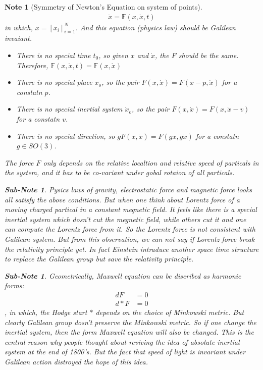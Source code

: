 \documentclass[pdf]{article}
\newtheorem{note}[theorem]{Note}
\newtheorem{subnote}[corollary]{Sub-Note}
\begin{document}
\begin{note}[Symmetry of Newton's Equation on system of points]
\begin{align}
\ddot x = \mathbb{F}(x,\dot{x},t)
\end{align}
in which, $x = [x_i]_{i=1}^N$. And this equation (physics law) should be Galilean invaiant.
\begin{itemize}
\item There is no special time $t_0$, so given $x$ and $\dot x$, the $F$ should be the same. Therefore, $\mathbb{F}(x,\dot{x},t) = \mathbb{F}(x,\dot{x})$
\item There is no special place $x_o$, so the pair $F(x, \dot x) = F(x-p, \dot x)$ for a constatn $p$.
\item There is no special inertial system $\dot x_o$, so the pair $F(x, \dot x) = F(x, \dot x -v )$ for a constatn $v$.
\item There is no special direction, so $gF(x, \dot x) = F(gx, g\dot x )$ for a constatn $g\in SO(3)$.
\end{itemize}
The force $F$ only depends on the relative localtion and relative speed of particals in the system, and it has to be co-variant under gobal rotaion of all particals.
\begin{subnote}
Pysics laws of gravity, electrostatic force and magnetic force looks all satisfy the above conditions. But when one think about Lorentz force of a moving charged partical in a constant megnetic field. It feels like there is a special inertial system which dosn't cut the megnetic field, while others cut it and one can compute the Lorentz force from it. So the Lorentz force is not consistent with Galilean system. But from this observation, we can not say if Lorentz force break the relativity principle yet. In fact Einstein intraduce another space time structure to replace the Galilean group but save the relativity principle.
\end{subnote}
\begin{subnote}
Geometrically, Maxwell equation can be discribed as harmonic forms:
\begin{align}
dF &= 0\\
d*F &= 0
\end{align}
, in which, the Hodge start $*$ depends on the choice of Minkowski metric. But clearly Galilean group dosn't preserve the Minkowski metric. So if one change the inertial system, then the form Maxwell equation will also be changed. This is the central reason why people thought about reviving the idea of absolute inertial system at the end of 1800's. But the fact that speed of light is invariant under Galilean action distroyed the hope of this idea. 
\end{subnote}
\end{note}
\end{document}
